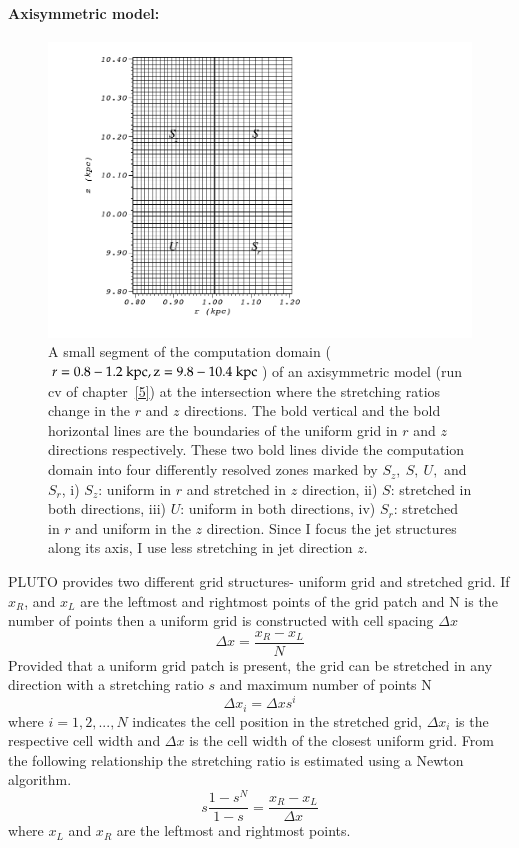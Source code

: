 \paragraph{Axisymmetric model:}
\begin{figure}
\centering
\includegraphics[width=\linewidth]{sgr.png}
\caption{A small segment of the computation domain ($r= 0.8 - 1.2~ \rm kpc, z = 9.8-10.4~\rm kpc$) of an axisymmetric model (run cv of chapter~\ref{5}) at the intersection where the stretching ratios change in the $r$ and $z$ directions. The bold vertical and the bold horizontal lines are the boundaries of the uniform grid in $r$ and $z$ directions respectively. These two bold lines divide the computation domain into four differently resolved zones marked by $S_z, \ S, \ U,$ and $S_r$, i) $S_z$: uniform in  $r$ and stretched in $z$ direction, ii) $S$: stretched in both directions, iii) $U$: uniform in both directions, iv) $S_r$: stretched in $r$ and uniform in the $z$ direction. Since I focus the jet structures along its axis, I use less stretching in jet direction $z$.}
\label{f:sgr}
\end{figure}

PLUTO provides two different grid structures- uniform grid and stretched grid. If $x_R$, and $x_L$ are the leftmost and rightmost points of the grid patch and N is the number of  points then a uniform grid is constructed with cell spacing $\Delta x$
\begin{equation}
\Delta x = \frac{x_R-x_L}{N}
\end{equation} 
Provided that a uniform grid patch is present, the grid can be stretched in any direction with a stretching ratio $s$ and maximum number of points N
\begin{equation}
\Delta x_i = \Delta x s^i
\end{equation}
where $i = 1, 2, ..., N$ indicates the cell position in the stretched grid, $\Delta x_i$ is the respective cell width and $\Delta x$ is the cell width of the closest uniform grid.
From the following relationship the stretching ratio is estimated using a Newton algorithm. 
\begin{equation}
s\frac{1-s^N}{1-s}= \frac{x_R-x_L}{\Delta x}
\end{equation}
where $x_L$ and $x_R$ are the leftmost and rightmost points. 

